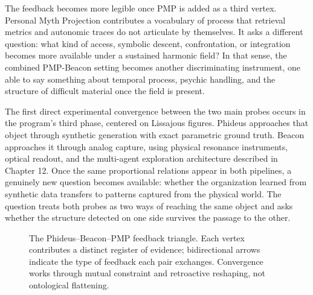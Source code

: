 The feedback becomes more legible once PMP is added as a third vertex. Personal Myth Projection contributes a vocabulary of process that retrieval metrics and autonomic traces do not articulate by themselves. It asks a different question: what kind of access, symbolic descent, confrontation, or integration becomes more available under a sustained harmonic field? In that sense, the combined PMP-Beacon setting becomes another discriminating instrument, one able to say something about temporal process, psychic handling, and the structure of difficult material once the field is present.

The first direct experimental convergence between the two main probes occurs in the program's third phase, centered on Lissajous figures. Phideus approaches that object through synthetic generation with exact parametric ground truth. Beacon approaches it through analog capture, using physical resonance instruments, optical readout, and the multi-agent exploration architecture described in Chapter 12. Once the same proportional relations appear in both pipelines, a genuinely new question becomes available: whether the organization learned from synthetic data transfers to patterns captured from the physical world. The question treats both probes as two ways of reaching the same object and asks whether the structure detected on one side survives the passage to the other.

\begin{figure}[ht]
\centering
{}
\caption{The Phideus--Beacon--PMP feedback triangle. Each vertex contributes a distinct register of evidence; bidirectional arrows indicate the type of feedback each pair exchanges. Convergence works through mutual constraint and retroactive reshaping, not ontological flattening.}
\label{fig:convergence_triangle}
\end{figure}


